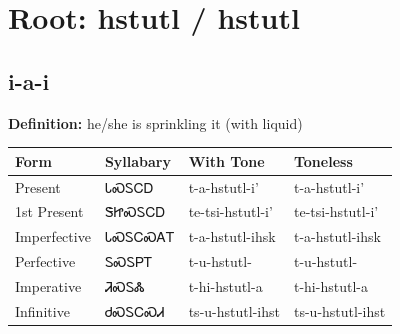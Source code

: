 \documentclass{article}%
\begin{document}
%
\normalsize%
\section*{Root: hstutl / hstutl}%
\subsection*{i-a-i}%
\textbf{Definition: }%
he/she is sprinkling it (with liquid)%
\\[0.5em]%
\begin{tabular}{|l|l|l|l|}%
\hline%
\textbf{Form}&\textbf{Syllabary}&\textbf{With Tone}&\textbf{Toneless}\\%
\hline%
Present&ᏓᏍᏚᏟᎠ&t{-}a{-}hstutl{-}i'&t{-}a{-}hstutl{-}i'\\%
1st Present&ᏕᏥᏍᏚᏟᎠ&te{-}tsi{-}hstutl{-}i'&te{-}tsi{-}hstutl{-}i'\\%
Imperfective&ᏓᏍᏚᏟᏍᎪᎢ&t{-}a{-}hstutl{-}ihsk&t{-}a{-}hstutl{-}ihsk\\%
Perfective&ᏚᏍᏚᏢᎢ&t{-}u{-}hstutl{-}&t{-}u{-}hstutl{-}\\%
Imperative&ᏘᏍᏚᏜ&t{-}hi{-}hstutl{-}a&t{-}hi{-}hstutl{-}a\\%
Infinitive&ᏧᏍᏚᏟᏍᏗ&ts{-}u{-}hstutl{-}ihst&ts{-}u{-}hstutl{-}ihst\\%
\hline%
\end{tabular}%
\\[1em]%
\end{document}
